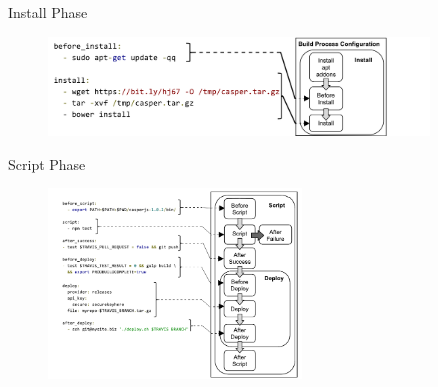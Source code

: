 \documentclass[aspectratio=169,xcolor=dvipsnames]{beamer}
\begin{document}
\begin{frame}{Install Phase}
    \begin{figure}
        \centering
        \includegraphics[width=0.9\textwidth]{images/install.png}
        \label{fig:my_label}
    \end{figure}
\end{frame}

\begin{frame}{Script Phase}
    \begin{figure}
        \centering
        \includegraphics[width=0.6\textwidth]{images/Script_phase.png}
        \label{fig:my_label}
    \end{figure}
\end{frame}


\end{document}
